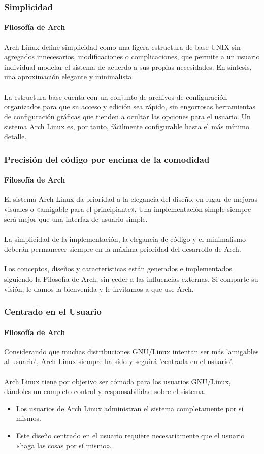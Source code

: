 \documentclass[9pt,t]{beamer}
\begin{document}
\begin{frame}\justifying
  \frametitle{Simplicidad}
  \framesubtitle{Filosofía de Arch}
    Arch Linux define simplicidad como una ligera estructura de base UNIX sin agregados innecesarios, modificaciones
    o complicaciones, que permite a un usuario individual modelar el sistema de acuerdo a sus propias necesidades. 
    En síntesis, una aproximación elegante y minimalista.
    \ \\ \ \\
	La estructura base cuenta con un conjunto de archivos de configuración organizados para que su acceso y edición 
    sea rápido, sin engorrosas herramientas de configuración gráficas que tienden a ocultar las opciones para el 
    usuario. Un sistema Arch Linux es, por tanto, fácilmente configurable hasta el más mínimo detalle.
\end{frame}

\begin{frame}\justifying
  \frametitle{Precisión del código por encima de la comodidad}
  \framesubtitle{Filosofía de Arch}
    El sistema Arch Linux da prioridad a la elegancia del diseño, en lugar de mejoras visuales o «amigable para el principiante».
    Una implementación simple siempre será mejor que una interfaz de usuario simple.
    \ \\ \ \\
	La simplicidad de la implementación, la elegancia de código y el minimalismo deberán permanecer siempre en la máxima 
    prioridad del desarrollo de Arch.
    \ \\ \ \\
    Los conceptos, diseños y características están generados e implementados siguiendo la Filosofía de Arch, sin ceder a 
    las influencias externas. Si comparte su visión, le damos la bienvenida y le invitamos a que use Arch.
\end{frame}

\begin{frame}\justifying
  \frametitle{Centrado en el Usuario}
  \framesubtitle{Filosofía de Arch}
    Considerando que muchas distribuciones GNU/Linux intentan ser más 'amigables al usuario', Arch Linux siempre 
    ha sido y seguirá 'centrada en el usuario'.
    \ \\ \ \\
    Arch Linux tiene por objetivo ser cómoda para los usuarios GNU/Linux, dándoles un completo control y responsabilidad 
    sobre el sistema.
    \begin{itemize}\justifying
      \item Los usuarios de Arch Linux administran el sistema completamente por sí mismos.
      \item Este diseño centrado en el usuario requiere necesariamente que el usuario «haga las cosas por sí mismo».
    \end{itemize}
\end{frame}
\end{document}
